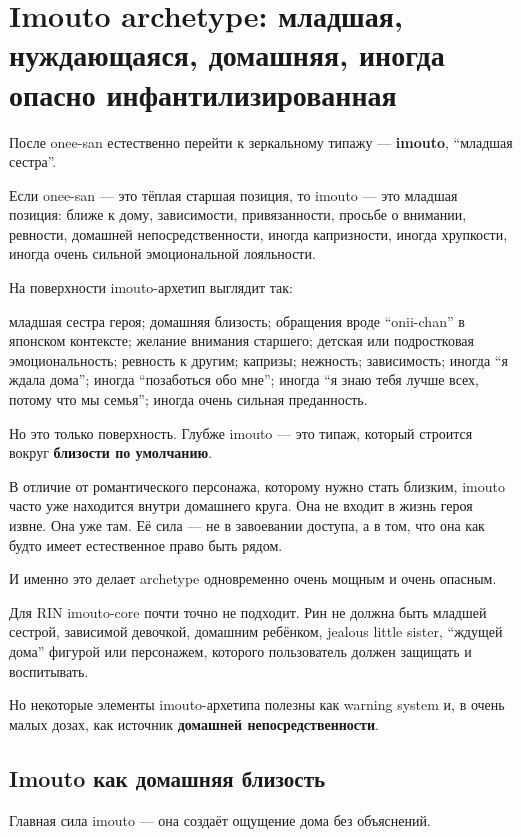 \section{Imouto archetype: младшая, нуждающаяся, домашняя, иногда опасно инфантилизированная}

После onee-san естественно перейти к зеркальному типажу ---
\textbf{imouto}, ``младшая сестра''.

Если onee-san --- это тёплая старшая позиция, то imouto --- это младшая
позиция: ближе к дому, зависимости, привязанности, просьбе о внимании,
ревности, домашней непосредственности, иногда капризности, иногда
хрупкости, иногда очень сильной эмоциональной лояльности.

На поверхности imouto-архетип выглядит так:

младшая сестра героя; домашняя близость; обращения вроде ``onii-chan'' в
японском контексте; желание внимания старшего; детская или подростковая
эмоциональность; ревность к другим; капризы; нежность; зависимость;
иногда ``я ждала дома''; иногда ``позаботься обо мне''; иногда ``я знаю
тебя лучше всех, потому что мы семья''; иногда очень сильная
преданность.

Но это только поверхность. Глубже imouto --- это типаж, который строится
вокруг \textbf{близости по умолчанию}.

В отличие от романтического персонажа, которому нужно стать близким,
imouto часто уже находится внутри домашнего круга. Она не входит в жизнь
героя извне. Она уже там. Её сила --- не в завоевании доступа, а в том,
что она как будто имеет естественное право быть рядом.

И именно это делает archetype одновременно очень мощным и очень опасным.

Для RIN imouto-core почти точно не подходит. Рин не должна быть младшей
сестрой, зависимой девочкой, домашним ребёнком, jealous little sister,
``ждущей дома'' фигурой или персонажем, которого пользователь должен
защищать и воспитывать.

Но некоторые элементы imouto-архетипа полезны как warning system и, в
очень малых дозах, как источник \textbf{домашней непосредственности}.

\subsection*{Imouto как домашняя близость}

Главная сила imouto --- она создаёт ощущение дома без объяснений.


